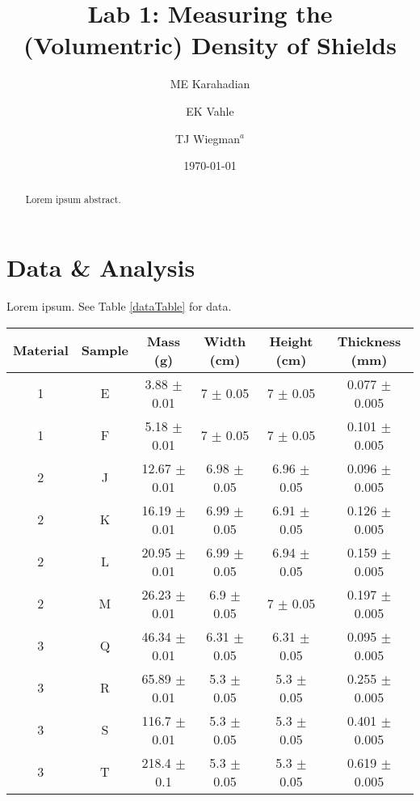 \documentclass[
    letterpaper, twocolumn, graphicx,
    amsmath, amsfonts, amssymb,
    nofootinbib
]{revtex4-1}
\begin{document}
    \title{Lab 1: Measuring the (Volumentric) Density of Shields}
    
    \author{ME Karahadian}
    \author{EK Vahle}
    \author{TJ Wiegman\(^a\)}
    
    \date{\today}
    

    \begin{abstract}
        Lorem ipsum abstract.
    \end{abstract}
    
    \maketitle
    
    \section*{Data \& Analysis}
    Lorem ipsum. See Table \ref{dataTable} for data.
    
    \begin{table*}[hbt!]
        \caption{Example caption.
            \label{dataTable}
        }
        
        \begin{tabular}{|c|c|c|c|c|c|}
            \hline
            
            \textbf{Material} & \textbf{Sample} & \textbf{Mass (g)} & \textbf{Width (cm)} & \textbf{Height (cm)} & \textbf{Thickness (mm)}\\
            \hline
            1 & E & 3.88 \(\pm\) 0.01 & 7 \(\pm\) 0.05 & 7 \(\pm\) 0.05 & 0.077 \(\pm\) 0.005 \\
            1 & F & 5.18 \(\pm\) 0.01 & 7 \(\pm\) 0.05 & 7 \(\pm\) 0.05 & 0.101 \(\pm\) 0.005 \\
            \hline
            2 & J & 12.67 \(\pm\) 0.01 & 6.98 \(\pm\) 0.05 & 6.96 \(\pm\) 0.05 & 0.096 \(\pm\) 0.005 \\
            2 & K & 16.19 \(\pm\) 0.01 & 6.99 \(\pm\) 0.05 & 6.91 \(\pm\) 0.05 & 0.126 \(\pm\) 0.005 \\
            2 & L & 20.95 \(\pm\) 0.01 & 6.99 \(\pm\) 0.05 & 6.94 \(\pm\) 0.05 & 0.159 \(\pm\) 0.005 \\
            2 & M & 26.23 \(\pm\) 0.01 & 6.9 \(\pm\) 0.05 & 7 \(\pm\) 0.05 & 0.197 \(\pm\) 0.005 \\
            \hline
            3 & Q & 46.34 \(\pm\) 0.01 & 6.31 \(\pm\) 0.05 & 6.31 \(\pm\) 0.05 & 0.095 \(\pm\) 0.005 \\
            3 & R & 65.89 \(\pm\) 0.01 & 5.3 \(\pm\) 0.05 & 5.3 \(\pm\) 0.05 & 0.255 \(\pm\) 0.005 \\
            3 & S & 116.7 \(\pm\) 0.01 & 5.3 \(\pm\) 0.05 & 5.3 \(\pm\) 0.05 & 0.401 \(\pm\) 0.005 \\
            3 & T & 218.4 \(\pm\) 0.1 & 5.3 \(\pm\) 0.05 & 5.3 \(\pm\) 0.05 & 0.619 \(\pm\) 0.005 \\
            
            \hline
        \end{tabular}
    \end{table*}
\end{document}
